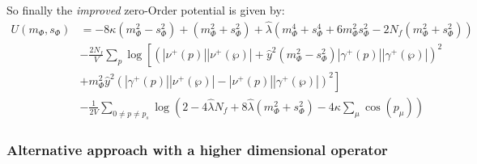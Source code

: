 So finally the \textit{improved} zero-Order potential is given by:
\begin{align}\label{eq:improved_zeroOrderPot}
 U(m_{\Phi}, s_{\Phi}) &= -8 \kappa \left( m_{\Phi}^2 - s_{\Phi}^2 \right)   +   \left( m_{\Phi}^2 + s_{\Phi}^2 \right)
                         + \hat\lambda \left( m_{\Phi}^4 + s_{\Phi}^4 + 6 m_{\Phi}^2 s_{\Phi}^2 - 2 N_f \left(m_{\Phi}^2 + s_{\Phi}^2 \right) \right) 
                           \nonumber \\
                        & -\frac{2N_f}{V} \sum\limits_p \log
                                    \left[ \left( |\nu^+(p)| |\nu^+(\wp)|   +
                                    \hat y ^2 \left( m_{\Phi}^2 - s_{\Phi}^2 \right) |\gamma^+(p)| |\gamma^+(\wp)|\right)^2 
                                    \nonumber \right. \\ 
                        & \left. +  m_{\Phi}^2 \hat y^2 \left( |\gamma^+(p)| |\nu^+(\wp)|   -   |\nu^+(p)| |\gamma^+(\wp)| \right)^2\right]
                        \nonumber \\
                        & - \frac{1}{2V}\sum\limits_{0 \neq p \neq p_s} 
          \log\left( 2 - 4 \hat\lambda N_f + 8 \hat\lambda \left( m_{\Phi}^2 + s_{\Phi}^2  \right) - 4 \kappa \sum_{\mu} \cos(p_{\mu}) \right)
\end{align}
% 
% 
\subsubsection*{Alternative approach with a higher dimensional operator}

